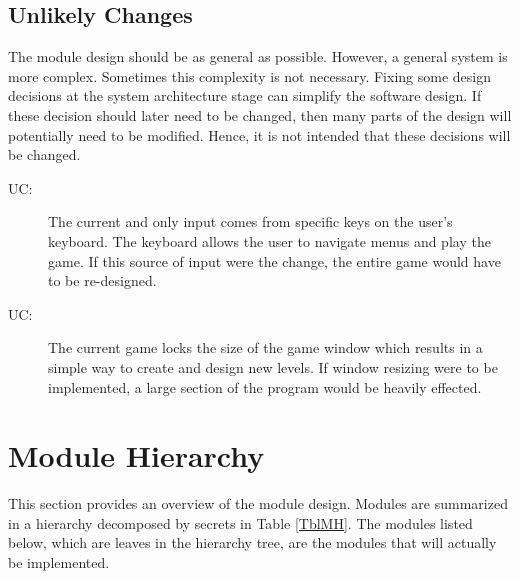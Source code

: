 \documentclass[12pt, titlepage]{article}
\newcounter{ucnum}
\newcommand{\uctheucnum}{UC\theucnum}
\begin{document}
\subsection{Unlikely Changes} \label{SecUchange}

The module design should be as general as possible. However, a general system is
more complex. Sometimes this complexity is not necessary. Fixing some design
decisions at the system architecture stage can simplify the software design. If
these decision should later need to be changed, then many parts of the design
will potentially need to be modified. Hence, it is not intended that these
decisions will be changed.

\begin{description}
\item[ \uctheucnum \label{ucIO}:] The current and only input comes from specific keys on the user's keyboard. The keyboard allows the user to navigate menus and play the game. If this source of input were the change, the entire game would have to be re-designed.
\item[ \uctheucnum \label{ucWindow}:] The current game locks the size of the game window which results in a simple way to create and design new levels. If window resizing were to be implemented, a large section of the program would be heavily effected.
\end{description}

\section{Module Hierarchy} \label{SecMH}

This section provides an overview of the module design. Modules are summarized
in a hierarchy decomposed by secrets in Table \ref{TblMH}. The modules listed
below, which are leaves in the hierarchy tree, are the modules that will
actually be implemented.
\end{document}
